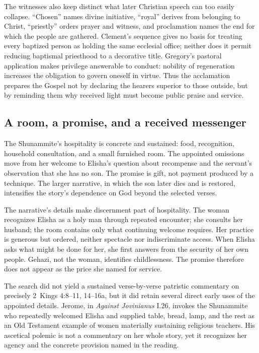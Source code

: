 \begin{deepstudy}
The witnesses also keep distinct what later Christian speech can too easily collapse. “Chosen” names divine initiative, “royal” derives from belonging to Christ, “priestly” orders prayer and witness, and proclamation names the end for which the people are gathered. Clement's sequence gives no basis for treating every baptized person as holding the same ecclesial office; neither does it permit reducing baptismal priesthood to a decorative title. Gregory's pastoral application makes privilege answerable to conduct: nobility of regeneration increases the obligation to govern oneself in virtue. Thus the acclamation prepares the Gospel not by declaring the hearers superior to those outside, but by reminding them why received light must become public praise and service.

\subsection*{A room, a promise, and a received messenger\enspace{}}

The Shunammite's hospitality is concrete and sustained: food, recognition, household consultation, and a small furnished room. The appointed omissions move from her welcome to Elisha's question about recompense and the servant's observation that she has no son. The promise is gift, not payment produced by a technique. The larger narrative, in which the son later dies and is restored, intensifies the story's dependence on God beyond the selected verses.

The narrative's details make discernment part of hospitality. The woman recognizes Elisha as a holy man through repeated encounter; she consults her husband; the room contains only what continuing welcome requires. Her practice is generous but ordered, neither spectacle nor indiscriminate access. When Elisha asks what might be done for her, she first answers from the security of her own people. Gehazi, not the woman, identifies childlessness. The promise therefore does not appear as the price she named for service.

The search did not yield a sustained verse-by-verse patristic commentary on precisely 2~Kings 4:8--11, 14--16a, but it did retain several direct early uses of the appointed details. Jerome, in \emph{Against Jovinianus} I.26, invokes the Shunammite who repeatedly welcomed Elisha and supplied table, bread, lamp, and the rest as an Old Testament example of women materially sustaining religious teachers. His ascetical polemic is not a commentary on her whole story, yet it recognizes her agency and the concrete provision named in the reading.


\end{deepstudy}
